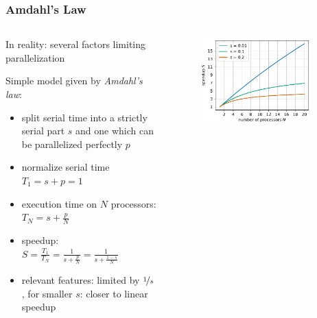 \documentclass[aspectratio=169]{beamer}
\begin{document}
\begin{frame}
	\frametitle{Amdahl's Law}
	
	\begin{columns}
		\begin{column}{0.5\textwidth}
			In reality: several factors limiting parallelization

			Simple model given by \emph{Amdahl's law}:
			\begin{itemize}
				\item split serial time into a strictly serial part \(s\) and one which can be parallelized perfectly \(p\)
				\item normalize serial time \(T_1 = s + p = 1\)
				\item execution time on \(N\) processors: \(T_N = s + \frac{p}{N}\)
				\item speedup: \(S = \frac{T_1}{T_N} = \frac{1}{s + \frac{p}{N}} = \frac{1}{s + \frac{1 - s}{N}}\)
				\item relevant features: limited by \(\nicefrac{1}{s}\), for smaller \(s\): closer to linear speedup
			\end{itemize}
		\end{column}

		\begin{column}{0.5\textwidth}
			\begin{figure}
				\centering
				\includegraphics[width=0.9\textwidth]{figs/amdahl.pdf}
				\label{fig:amdahl}
			\end{figure}
		\end{column}
	\end{columns}
\end{frame}
\end{document}
